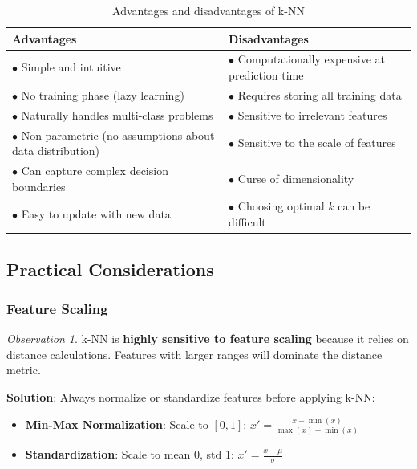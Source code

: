 \documentclass[11pt,a4paper]{article}
\theoremstyle{definition}
\theoremstyle{plain}
\theoremstyle{remark}
\newtheorem*{observation}{Observation}
\begin{document}
\begin{table}[h]
\centering
\begin{tabular}{|p{7cm}|p{7cm}|}
\hline
\textbf{Advantages} & \textbf{Disadvantages} \\
\hline
$\bullet$ Simple and intuitive & $\bullet$ Computationally expensive at prediction time \\
$\bullet$ No training phase (lazy learning) & $\bullet$ Requires storing all training data \\
$\bullet$ Naturally handles multi-class problems & $\bullet$ Sensitive to irrelevant features \\
$\bullet$ Non-parametric (no assumptions about data distribution) & $\bullet$ Sensitive to the scale of features \\
$\bullet$ Can capture complex decision boundaries & $\bullet$ Curse of dimensionality \\
$\bullet$ Easy to update with new data & $\bullet$ Choosing optimal $k$ can be difficult \\
\hline
\end{tabular}
\caption{Advantages and disadvantages of k-NN}
\end{table}

\subsection{Practical Considerations}

\subsubsection{Feature Scaling}

\begin{observation}
k-NN is \textbf{highly sensitive to feature scaling} because it relies on distance calculations. Features with larger ranges will dominate the distance metric.
\end{observation}

\textbf{Solution}: Always normalize or standardize features before applying k-NN:
\begin{itemize}
    \item \textbf{Min-Max Normalization}: Scale to $[0, 1]$: $x' = \frac{x - \min(x)}{\max(x) - \min(x)}$
    
    \item \textbf{Standardization}: Scale to mean 0, std 1: $x' = \frac{x - \mu}{\sigma}$
\end{itemize}
\end{document}
